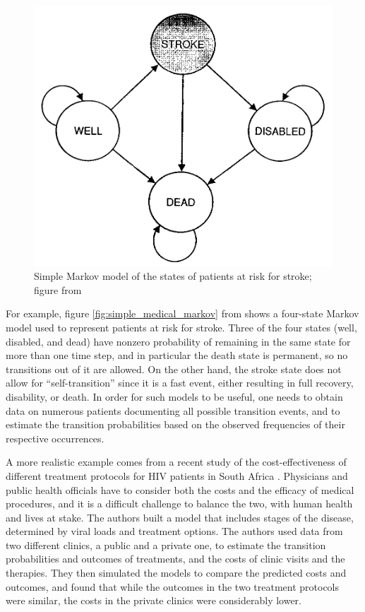 \documentclass[
]{book}
\theoremstyle{definition}
\theoremstyle{definition}
\theoremstyle{definition}
\theoremstyle{remark}
\begin{document}
\begin{figure}
\centering
\includegraphics{ch10/simple_medical_markov.png}
\caption{Simple Markov model of the states of patients at risk for stroke; figure from \citep{sonnenberg_markov_1993}}
\end{figure}

For example, figure \ref{fig:simple_medical_markov} from \citep{sonnenberg_markov_1993} shows a four-state Markov model used to represent patients at risk for stroke. Three of the four states (well, disabled, and dead) have nonzero probability of remaining in the same state for more than one time step, and in particular the death state is permanent, so no transitions out of it are allowed. On the other hand, the stroke state does not allow for ``self-transition'' since it is a fast event, either resulting in full recovery, disability, or death. In order for such models to be useful, one needs to obtain data on numerous patients documenting all possible transition events, and to estimate the transition probabilities based on the observed frequencies of their respective occurrences.

A more realistic example comes from a recent study of the cost-effectiveness of different treatment protocols for HIV patients in South Africa \citep{leisegang_novel_2013}. Physicians and public health officials have to consider both the costs and the efficacy of medical procedures, and it is a difficult challenge to balance the two, with human health and lives at stake. The authors built a model that includes stages of the disease, determined by viral loads and treatment options. The authors used data from two different clinics, a public and a private one, to estimate the transition probabilities and outcomes of treatments, and the costs of clinic visits and the therapies. They then simulated the models to compare the predicted costs and outcomes, and found that while the outcomes in the two treatment protocols were similar, the costs in the private clinics were considerably lower.
\end{document}
